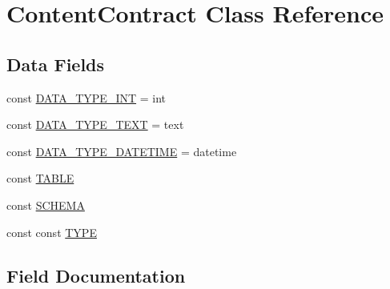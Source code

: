 \hypertarget{class_david_fricker_1_1_data_abstracter_1_1_content_contract}{}\section{Content\+Contract Class Reference}
\label{class_david_fricker_1_1_data_abstracter_1_1_content_contract}
\subsection*{Data Fields}
\begin{DoxyCompactItemize}
\item 
const \hyperlink{class_david_fricker_1_1_data_abstracter_1_1_content_contract_a20710e1b8d4d68cda1a9e322388eaa40}{D\+A\+T\+A\+\_\+\+T\+Y\+P\+E\+\_\+\+I\+NT} = \textquotesingle{}int\textquotesingle{}
\item 
const \hyperlink{class_david_fricker_1_1_data_abstracter_1_1_content_contract_ad2d4a1ea2c26e05370cfe0cf48c2b7e6}{D\+A\+T\+A\+\_\+\+T\+Y\+P\+E\+\_\+\+T\+E\+XT} = \textquotesingle{}text\textquotesingle{}
\item 
const \hyperlink{class_david_fricker_1_1_data_abstracter_1_1_content_contract_a89181a6bc4f9da7c20bc46864330cce9}{D\+A\+T\+A\+\_\+\+T\+Y\+P\+E\+\_\+\+D\+A\+T\+E\+T\+I\+ME} = \textquotesingle{}datetime\textquotesingle{}
\item 
const \hyperlink{class_david_fricker_1_1_data_abstracter_1_1_content_contract_adf62e2b172196282218b1ece3d200fa1}{T\+A\+B\+LE}
\item 
const \hyperlink{class_david_fricker_1_1_data_abstracter_1_1_content_contract_a865549ad67954f2274f6ca6c7792834e}{S\+C\+H\+E\+MA}
\item 
const const \hyperlink{class_david_fricker_1_1_data_abstracter_1_1_content_contract_af8318499ad8c154df6f47b6df9fbb808}{T\+Y\+PE}
\end{DoxyCompactItemize}


\subsection{Field Documentation}
\mbox{\label{class_david_fricker_1_1_data_abstracter_1_1_content_contract_a89181a6bc4f9da7c20bc46864330cce9}} 
